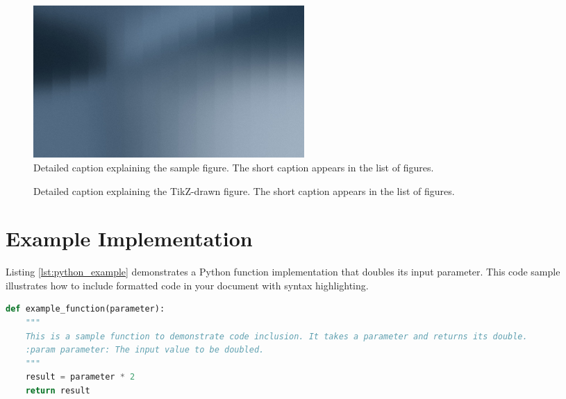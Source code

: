 \documentclass[12pt,a4paper]{report}
\begin{document}
\begin{spacing}{1.5}
    \begin{figure}[H]
        \centering
        \includegraphics[width=0.5\textwidth]{example-image.jpg} %
        \caption[Short caption for sample figure]{Detailed caption explaining the sample figure. The short caption appears in the list of figures.}
        \label{fig:external_image}
    \end{figure}

    \begin{figure}[H]
        \centering
        \caption[Short caption for TikZ figure]{Detailed caption explaining the TikZ-drawn figure. The short caption appears in the list of figures.}
        \label{fig:tikz_figure}
    \end{figure}


    \section{Example Implementation}
    Listing \ref{lst:python_example} demonstrates a Python function implementation that doubles its input parameter. This code sample illustrates how to include formatted code in your document with syntax highlighting.

    \begin{lstlisting}[language=Python, caption=Example Python Code, breaklines=true, label=lst:python_example]
def example_function(parameter):
    """
    This is a sample function to demonstrate code inclusion. It takes a parameter and returns its double.
    :param parameter: The input value to be doubled.
    """
    result = parameter * 2
    return result


\end{lstlisting}
\end{spacing}
\end{document}
